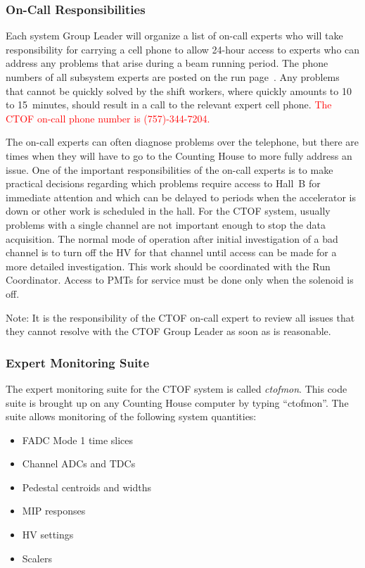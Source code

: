 \documentclass[12pt]{article}
\begin{document}
\subsubsection{On-Call Responsibilities}
\label{oncall}

Each system Group Leader will organize a list of on-call experts who will take responsibility for carrying a
cell phone to allow 24-hour access to experts who can address any problems that arise during a beam running
period. The phone numbers of all subsystem experts are posted on the run page~\cite{run-page}. Any problems
that cannot be quickly solved by the shift workers, where quickly amounts to 10 to 15~minutes, should result in
a call to the relevant expert cell phone. \textcolor{red}{The CTOF on-call phone number is (757)-344-7204.} 

The on-call experts can often diagnose problems over the telephone, but there are times when they will have
to go to the Counting House to more fully address an issue. One of the important responsibilities of the on-call
experts is to make practical decisions regarding which problems require access to Hall~B for immediate 
attention and which can be delayed to periods when the accelerator is down or other work is scheduled in the
hall. For the CTOF system, usually problems with a single channel are not important enough to stop the data
acquisition. The normal mode of operation after initial investigation of a bad channel is to turn off the HV for 
that channel until access can be made for a more detailed investigation. This work should be coordinated with
the Run Coordinator. Access to PMTs for service must be done only when the solenoid is off.

Note: It is the responsibility of the CTOF on-call expert to review all issues that they cannot resolve with the
CTOF Group Leader as soon as is reasonable.

\subsubsection{Expert Monitoring Suite}
\label{ctofmon}

The expert monitoring suite for the CTOF system is called {\it ctofmon}. This code suite is brought up on any
Counting House computer by typing ``ctofmon''. The suite allows monitoring of the following system quantities:

\begin{itemize}
\item FADC Mode 1 time slices
\item Channel ADCs and TDCs
\item Pedestal centroids and widths
\item MIP responses
\item HV settings
\item Scalers
\end{itemize}
\end{document}
